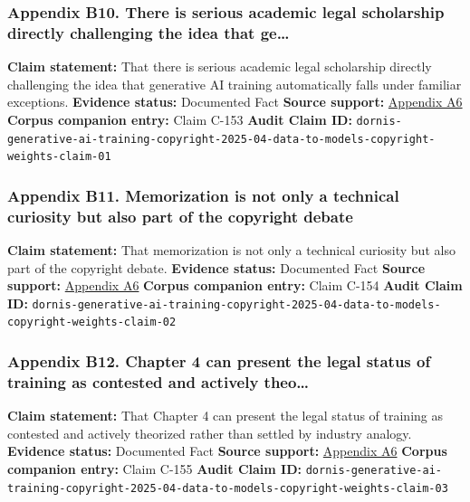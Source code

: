 \documentclass[
  american,
  11pt,
  letterpaper,
]{article}
\begin{document}
\subsubsection{Appendix B10. There is serious academic legal scholarship
directly challenging the idea that
ge\ldots{}}\label{ch-04-appendix-b10-there-is-serious-academic-legal-scholarship-directly-challenging-the-idea-that-ge}

\textbf{Claim statement:} That there is serious academic legal
scholarship directly challenging the idea that generative AI training
automatically falls under familiar exceptions. \textbf{Evidence status:}
Documented Fact \textbf{Source support:}
\hyperref[ch-04-appendix-a6-generative-ai-training-and-copyright-law]{Appendix
A6} \textbf{Corpus companion entry:} Claim C-153 \textbf{Audit Claim
ID:}
\texttt{dornis-generative-ai-training-copyright-2025-04-data-to-models-copyright-weights-claim-01}

\subsubsection{Appendix B11. Memorization is not only a technical
curiosity but also part of the copyright
debate}\label{ch-04-appendix-b11-memorization-is-not-only-a-technical-curiosity-but-also-part-of-the-copyright-debate}

\textbf{Claim statement:} That memorization is not only a technical
curiosity but also part of the copyright debate. \textbf{Evidence
status:} Documented Fact \textbf{Source support:}
\hyperref[ch-04-appendix-a6-generative-ai-training-and-copyright-law]{Appendix
A6} \textbf{Corpus companion entry:} Claim C-154 \textbf{Audit Claim
ID:}
\texttt{dornis-generative-ai-training-copyright-2025-04-data-to-models-copyright-weights-claim-02}

\subsubsection{Appendix B12. Chapter 4 can present the legal status of
training as contested and actively
theo\ldots{}}\label{ch-04-appendix-b12-chapter-4-can-present-the-legal-status-of-training-as-contested-and-actively-theo}

\textbf{Claim statement:} That Chapter 4 can present the legal status of
training as contested and actively theorized rather than settled by
industry analogy. \textbf{Evidence status:} Documented Fact
\textbf{Source support:}
\hyperref[ch-04-appendix-a6-generative-ai-training-and-copyright-law]{Appendix
A6} \textbf{Corpus companion entry:} Claim C-155 \textbf{Audit Claim
ID:}
\texttt{dornis-generative-ai-training-copyright-2025-04-data-to-models-copyright-weights-claim-03}
\end{document}

